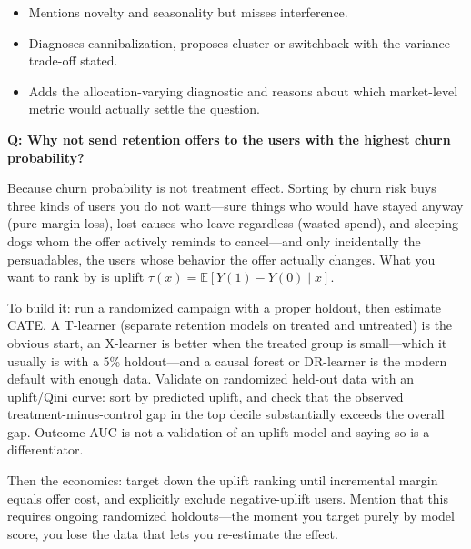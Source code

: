 \begin{interviewq}
\goodgreat
\begin{itemize}
    \item {} Mentions novelty and seasonality but misses interference.
    \item {} Diagnoses cannibalization, proposes cluster or switchback with the variance trade-off stated.
    \item {} Adds the allocation-varying diagnostic and reasons about which market-level metric would actually settle the question.
\end{itemize}

\end{interviewq}

\begin{interviewq}
\textbf{Q: Why not send retention offers to the users with the highest churn probability?}

 \quad {} \quad \badgefreq{\freqmed}

\stronganswer

Because churn probability is not treatment effect. Sorting by churn risk buys three kinds of users you do not want---sure things who would have stayed anyway (pure margin loss), lost causes who leave regardless (wasted spend), and sleeping dogs whom the offer actively reminds to cancel---and only incidentally the persuadables, the users whose behavior the offer actually changes. What you want to rank by is uplift $\tau(x) = \mathbb{E}[Y(1) - Y(0) \mid x]$.

To build it: run a randomized campaign with a proper holdout, then estimate CATE. A T-learner (separate retention models on treated and untreated) is the obvious start, an X-learner is better when the treated group is small---which it usually is with a 5\% holdout---and a causal forest or DR-learner is the modern default with enough data. Validate on randomized held-out data with an uplift/Qini curve: sort by predicted uplift, and check that the observed treatment-minus-control gap in the top decile substantially exceeds the overall gap. Outcome AUC is not a validation of an uplift model and saying so is a differentiator.

Then the economics: target down the uplift ranking until incremental margin equals offer cost, and explicitly exclude negative-uplift users. Mention that this requires ongoing randomized holdouts---the moment you target purely by model score, you lose the data that lets you re-estimate the effect.


\end{interviewq}
